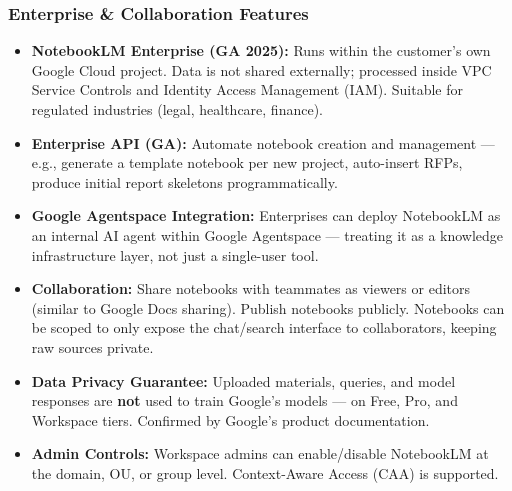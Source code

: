 \begin{frame}[fragile]\frametitle{Enterprise \& Collaboration Features}
  \begin{itemize}
    \item \textbf{NotebookLM Enterprise (GA 2025):} Runs within the customer's own Google Cloud project. Data is not shared externally; processed inside VPC Service Controls and Identity Access Management (IAM). Suitable for regulated industries (legal, healthcare, finance).
    \item \textbf{Enterprise API (GA):} Automate notebook creation and management — e.g., generate a template notebook per new project, auto-insert RFPs, produce initial report skeletons programmatically.
    \item \textbf{Google Agentspace Integration:} Enterprises can deploy NotebookLM as an internal AI agent within Google Agentspace — treating it as a knowledge infrastructure layer, not just a single-user tool.
    \item \textbf{Collaboration:} Share notebooks with teammates as viewers or editors (similar to Google Docs sharing). Publish notebooks publicly. Notebooks can be scoped to only expose the chat/search interface to collaborators, keeping raw sources private.
    \item \textbf{Data Privacy Guarantee:} Uploaded materials, queries, and model responses are \textbf{not} used to train Google's models — on Free, Pro, and Workspace tiers. Confirmed by Google's product documentation.
    \item \textbf{Admin Controls:} Workspace admins can enable/disable NotebookLM at the domain, OU, or group level. Context-Aware Access (CAA) is supported.
  \end{itemize}
\end{frame}

